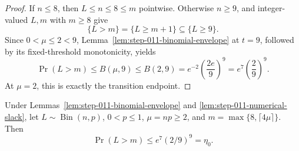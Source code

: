 \begin{proof}
If \(n\le8\), then \(L\le n\le8\le m\) pointwise.  Otherwise
\(n\ge9\), and integer-valued \(L,m\) with \(m\ge8\) give
\begin{equation}\label{eq:step-011-small-event}
\{L>m\}=\{L\ge m+1\}\subseteq\{L\ge9\}.
\end{equation}
Since \(0<\mu\le2<9\), Lemma~\ref{lem:step-011-binomial-envelope} at
\(t=9\), followed by its fixed-threshold monotonicity, yields
\begin{equation}\label{eq:step-011-small-envelope}
\Pr(L>m)\le B(\mu,9)\le B(2,9)
=e^{-2}\left(\frac{2e}{9}\right)^9
=e^7\left(\frac29\right)^9.
\end{equation}
At \(\mu=2\), this is exactly the transition endpoint.
\end{proof}

\begin{lemma}
\label{lem:step-011-large-mean}
Under Lemmas~\ref{lem:step-011-binomial-envelope} and
\ref{lem:step-011-numerical-slack}, let
\(L\sim\operatorname{Bin}(n,p)\), \(0<p\le1\), \(\mu=np\ge2\), and
\(m=\max\{8,\lceil4\mu\rceil\}\).  Then
\begin{equation}\label{eq:step-011-large-mean-bound}
\Pr(L>m)\le e^7(2/9)^9=\eta_0.
\end{equation}
\end{lemma}

